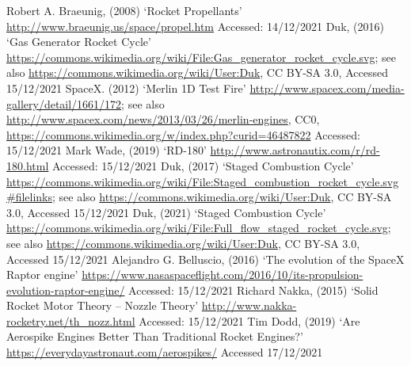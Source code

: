 \documentclass[11pt]{article}
\numberwithin{equation}{section}
\begin{document}
\begin{thebibliography}{00}
     Robert A. Braeunig, (2008) `Rocket Propellants' \url{http://www.braeunig.us/space/propel.htm} Accessed: 14/12/2021
     Duk, (2016) `Gas Generator Rocket Cycle' \url{https://commons.wikimedia.org/wiki/File:Gas_generator_rocket_cycle.svg}; see also \url{https://commons.wikimedia.org/wiki/User:Duk}, CC BY-SA 3.0, Accessed 15/12/2021
     SpaceX. (2012) `Merlin 1D Test Fire' \url{http://www.spacex.com/media-gallery/detail/1661/172}; see also \url{http://www.spacex.com/news/2013/03/26/merlin-engines}, CC0, \url{https://commons.wikimedia.org/w/index.php?curid=46487822} Accessed: 15/12/2021
     Mark Wade, (2019) `RD-180' \url{http://www.astronautix.com/r/rd-180.html} Accessed: 15/12/2021
     Duk, (2017) `Staged Combustion Cycle' \url{https://commons.wikimedia.org/wiki/File:Staged_combustion_rocket_cycle.svg#filelinks}; see also \url{https://commons.wikimedia.org/wiki/User:Duk}, CC BY-SA 3.0, Accessed 15/12/2021
     Duk, (2021) `Staged Combustion Cycle' \url{https://commons.wikimedia.org/wiki/File:Full_flow_staged_rocket_cycle.svg}; see also \url{https://commons.wikimedia.org/wiki/User:Duk}, CC BY-SA 3.0, Accessed 15/12/2021
     Alejandro G. Belluscio, (2016) `The evolution of the SpaceX Raptor engine' \url{https://www.nasaspaceflight.com/2016/10/its-propulsion-evolution-raptor-engine/} Accessed: 15/12/2021
     Richard Nakka, (2015) `Solid Rocket Motor Theory -- Nozzle Theory' \url{http://www.nakka-rocketry.net/th_nozz.html} Accessed: 15/12/2021
     Tim Dodd, (2019) `Are Aerospike Engines Better Than Traditional Rocket Engines?' \url{https://everydayastronaut.com/aerospikes/} Accessed 17/12/2021
\end{thebibliography}
\end{document}
